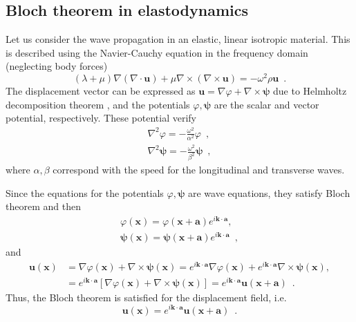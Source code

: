 \subsection{Bloch theorem in elastodynamics}
Let us consider the wave propagation in an elastic, linear isotropic material. This is described using the Navier-Cauchy equation in the frequency domain (neglecting body forces)
\[ (\lambda + \mu)\nabla(\nabla\cdot \mathbf{u}) + \mu \nabla\times(\nabla\times\mathbf{u})= -\omega^2\rho\mathbf{u} \enspace . \]
The displacement vector can be expressed as $\mathbf{u}=\nabla\varphi + \nabla\times \boldsymbol{\psi}$ due to Helmholtz decomposition theorem \cite{book:arfken, book:sepulveda_fismat}, and the potentials $\varphi,  \boldsymbol{\psi}$ are the scalar and vector potential, respectively. These potential verify
\begin{align*}
\nabla^2\varphi = -\frac{\omega^2}{\alpha^2} \varphi \enspace , \\
\nabla^2 \boldsymbol{\psi} = -\frac{\omega^2}{\beta^2} \boldsymbol{\psi} \enspace ,
\end{align*}
where $\alpha, \beta$ correspond with the speed for the longitudinal and transverse waves.

Since the equations for the potentials $\varphi,  \boldsymbol{\psi}$ are wave equations, they satisfy Bloch theorem and then
\begin{align*}
\varphi(\mathbf{x}) = \varphi(\mathbf{x}+\mathbf{a})e^{i\mathbf{k}\cdot \mathbf{a}} ,\\
 \boldsymbol{\psi}(\mathbf{x}) =  \boldsymbol{\psi}(\mathbf{x}+\mathbf{a})e^{i\mathbf{k}\cdot \mathbf{a}} \enspace ,
\end{align*}
and
\begin{align*}
\mathbf{u}(\mathbf{x}) &= \nabla\varphi(\mathbf{x}) + \nabla\times \boldsymbol{\psi}(\mathbf{x}) = e^{i\mathbf{k}\cdot\mathbf{a}}\nabla\varphi(\mathbf{x}) + e^{i\mathbf{k}\cdot\mathbf{a}}\nabla\times \boldsymbol{\psi}(\mathbf{x}) ,\\
&= e^{i\mathbf{k}\cdot\mathbf{a}}\left[ \nabla\varphi(\mathbf{x}) + \nabla\times \boldsymbol{\psi}(\mathbf{x}) \right] =  e^{i\mathbf{k}\cdot\mathbf{a}}\mathbf{u}(\mathbf{x}+\mathbf{a}) \enspace .
\end{align*}
Thus, the Bloch theorem is satisfied for the displacement field, i.e.
\[\mathbf{u}(\mathbf{x}) = e^{i\mathbf{k}\cdot\mathbf{a}} \mathbf{u}(\mathbf{x}+\mathbf{a}) \enspace .\]

